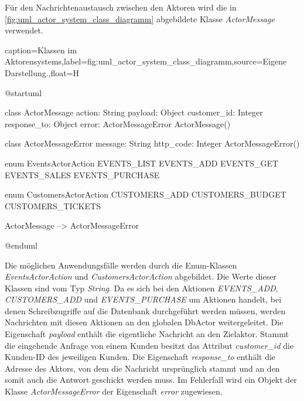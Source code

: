 Für den Nachrichtenaustausch zwischen den Aktoren wird die in \autoref{fig:uml_actor_system_class_diagramm} abgebildete Klasse \textit{ActorMessage} verwendet.

\begin{dhbwfigure}{caption=Klassen im Aktorensystems,label=fig:uml_actor_system_class_diagramm,source={Eigene Darstellung.},float=H}
    \begin{plantuml}
        @startuml

        class ActorMessage {
            action: String
            payload: Object 
            customer_id: Integer
            response_to: Object
            error: ActorMessageError
            ActorMessage()
        }

        class ActorMessageError {
            message: String
            http_code: Integer 
            ActorMessageError()
        }

        enum EventsActorAction {
            EVENTS_LIST
            EVENTS_ADD
            EVENTS_GET
            EVENTS_SALES
            EVENTS_PURCHASE
        }

        enum CustomersActorAction {
            CUSTOMERS_ADD
            CUSTOMERS_BUDGET
            CUSTOMERS_TICKETS
        }

        ActorMessage --> ActorMessageError

        @enduml
    \end{plantuml}
\end{dhbwfigure}\unskip

Die möglichen Anwendungsfälle werden durch die Enum-Klassen \textit{EventsActorAction} und \textit{CustomersActorAction} abgebildet.
Die Werte dieser Klassen sind vom Typ \textit{String}.
Da es sich bei den Aktionen \textit{EVENTS\_ADD}, \textit{CUSTOMERS\_ADD} und \textit{EVENTS\_PURCHASE} um Aktionen handelt, bei denen Schreibzugriffe auf die Datenbank durchgeführt werden müssen, werden Nachrichten mit diesen Aktionen an den globalen DbActor weitergeleitet.
Die Eigenschaft \textit{payload} enthält die eigentliche Nachricht an den Zielaktor.
Stammt die eingehende Anfrage von einem Kunden besitzt das Attribut \textit{customer\_id} die Kunden-ID des jeweiligen Kunden.
Die Eigenschaft \textit{response\_to} enthält die Adresse des Aktors, von dem die Nachricht ursprünglich stammt und an den somit auch die Antwort geschickt werden muss.
Im Fehlerfall wird ein Objekt der Klasse \textit{ActorMessageError} der Eigenschaft \textit{error} zugewiesen.
